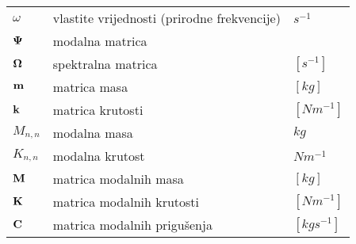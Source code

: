 \begin{tabularx}{\textwidth}{X l l}
    $\omega$                    & vlastite vrijednosti (prirodne frekvencije) & $s^{-1}$\\
    $\mathbf{\Psi}$                     & modalna matrica                           & \\
    $\mathbf{\Omega}$                   & spektralna matrica                        & $[s^{-1}]$\\
    $\mathbf{m}$                       & matrica masa                              & $[kg]$\\
    $\mathbf{k}$                       & matrica krutosti                          & $[Nm^{-1}]$\\
    $M_{n,n}$                   & modalna masa                              & $kg$\\
    $K_{n,n}$                   & modalna krutost                           & $Nm^{-1}$\\
    $\mathbf{M}$                        & matrica modalnih masa                     & $[kg]$\\
    $\mathbf{K}$                        & matrica modalnih krutosti                 & $[Nm^{-1}]$\\
    $\mathbf{C}$                        & matrica modalnih prigušenja               & $[kgs^{-1}]$ 
\end{tabularx}
